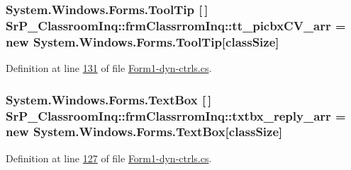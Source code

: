 \hypertarget{class_sr_p___classroom_inq_1_1frm_classrrom_inq_a2b443a71216ac1b9a63f9db496161a4d}{
\subsubsection[{tt\-\_\-picbx\-C\-V\-\_\-arr}]{\setlength{\rightskip}{0pt plus 5cm}\-System.\-Windows.\-Forms.\-Tool\-Tip \mbox{[}$\,$\mbox{]} {\bf \-Sr\-P\-\_\-\-Classroom\-Inq\-::frm\-Classrrom\-Inq\-::tt\-\_\-picbx\-C\-V\-\_\-arr} = new \-System.\-Windows.\-Forms.\-Tool\-Tip\mbox{[}{\bf class\-Size}\mbox{]}}}
\label{class_sr_p___classroom_inq_1_1frm_classrrom_inq_a2b443a71216ac1b9a63f9db496161a4d}


\-Definition at line \hyperlink{_form1-dyn-ctrls_8cs_source_l00131}{131} of file \hyperlink{_form1-dyn-ctrls_8cs_source}{\-Form1-\/dyn-\/ctrls.\-cs}.

\hypertarget{class_sr_p___classroom_inq_1_1frm_classrrom_inq_a3411157caafbe33c31a364fafd548afb}{
\subsubsection[{txtbx\-\_\-reply\-\_\-arr}]{\setlength{\rightskip}{0pt plus 5cm}\-System.\-Windows.\-Forms.\-Text\-Box \mbox{[}$\,$\mbox{]} {\bf \-Sr\-P\-\_\-\-Classroom\-Inq\-::frm\-Classrrom\-Inq\-::txtbx\-\_\-reply\-\_\-arr} = new \-System.\-Windows.\-Forms.\-Text\-Box\mbox{[}{\bf class\-Size}\mbox{]}}}
\label{class_sr_p___classroom_inq_1_1frm_classrrom_inq_a3411157caafbe33c31a364fafd548afb}


\-Definition at line \hyperlink{_form1-dyn-ctrls_8cs_source_l00127}{127} of file \hyperlink{_form1-dyn-ctrls_8cs_source}{\-Form1-\/dyn-\/ctrls.\-cs}.

